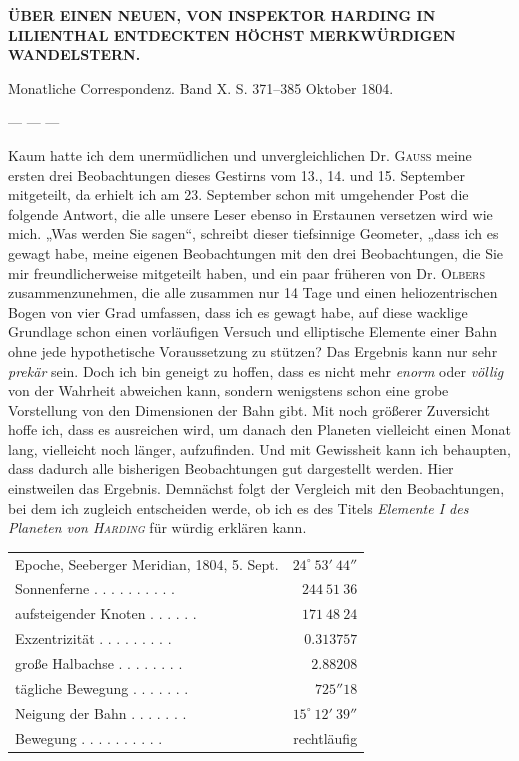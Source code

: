 \clearpage
{}
\hypertarget{native-255-lower}{}
\begin{center}
\textbf{ÜBER EINEN NEUEN, VON INSPEKTOR HARDING IN LILIENTHAL ENTDECKTEN HÖCHST MERKWÜRDIGEN WANDELSTERN.}
\end{center}

\begin{center}
Monatliche Correspondenz. Band X. S. 371–385 Oktober 1804.
\end{center}

\begin{center}
— — —
\end{center}

Kaum hatte ich dem unermüdlichen und unvergleichlichen Dr. \textsc{Gauss} meine ersten drei Beobachtungen dieses Gestirns vom 13., 14. und 15. September mitgeteilt, da erhielt ich am 23. September schon mit umgehender Post die folgende Antwort, die alle unsere Leser ebenso in Erstaunen versetzen wird wie mich. „Was werden Sie sagen“, schreibt dieser tiefsinnige Geometer, „dass ich es gewagt habe, meine eigenen Beobachtungen mit den drei Beobachtungen, die Sie mir freundlicherweise mitgeteilt haben, und ein paar früheren von Dr. \textsc{Olbers} zusammenzunehmen, die alle zusammen nur 14 Tage und einen heliozentrischen Bogen von vier Grad umfassen, dass ich es gewagt habe, auf diese wacklige Grundlage schon einen vorläufigen Versuch und elliptische Elemente einer Bahn ohne jede hypothetische Voraussetzung zu stützen? Das Ergebnis kann nur sehr \textit{prekär} sein. Doch ich bin geneigt zu hoffen, dass es nicht mehr \textit{enorm} oder \textit{völlig} von der Wahrheit abweichen kann, sondern wenigstens schon eine grobe Vorstellung von den Dimensionen der Bahn gibt. Mit noch größerer Zuversicht hoffe ich, dass es ausreichen wird, um danach den Planeten vielleicht einen Monat lang, vielleicht noch länger, aufzufinden. Und mit Gewissheit kann ich behaupten, dass dadurch alle bisherigen Beobachtungen gut dargestellt werden. Hier einstweilen das Ergebnis. Demnächst folgt der Vergleich mit den Beobachtungen, bei dem ich zugleich entscheiden werde, ob ich es des Titels \textit{Elemente I des Planeten von \textsc{Harding}} für würdig erklären kann.

\begin{center}
\begingroup\fontsize{9}{11}\selectfont\setlength{\tabcolsep}{3pt}
\begin{tabular}{lr}
Epoche, Seeberger Meridian, 1804, 5. Sept.  & $24^\circ\ 53'\ 44''$ \\
Sonnenferne . . . . . . . . . . & $244\ 51\ 36$ \\
aufsteigender Knoten . . . . . . & $171\ 48\ 24$ \\
Exzentrizität . . . . . . . . . & $0.313757$ \\
große Halbachse . . . . . . . . & $2.88208$ \\
tägliche Bewegung . . . . . . . & $725''18$ \\
Neigung der Bahn . . . . . . . & $15^\circ\ 12'\ 39''$ \\
Bewegung . . . . . . . . . . & rechtläufig \\
\end{tabular}\endgroup
\end{center}

